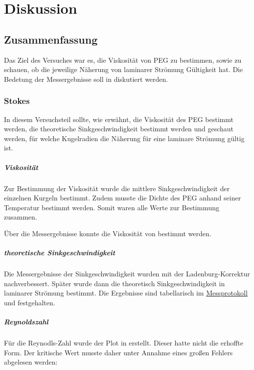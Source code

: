 \chapter{Diskussion}
\label{ch:Diskussion}

\section{Zusammenfassung}
\label{sec:Zusammenfassung}
Das Ziel des Versuches war es, die Viskosität von PEG zu bestimmen, sowie zu schauen, ob die jeweilige Näherung von laminarer Strömung Gültigkeit hat.
Die Bedetung der Messergebnisse soll in  diskutiert werden.

\subsection{Stokes}
In diesem Versuchsteil sollte, wie erwähnt, die Viskosität des PEG bestimmt werden, die theoretische Sinkgeschwindigkeit bestimmt werden und geschaut werden, für welche Kugelradien die Näherung für eine laminare Strömung gültig ist. 

\paragraph{Viskosität}
Zur Bestimmung der Viskosität wurde die mittlere Sinkgeschwindigkeit der einzelnen Kurgeln bestimmt. Zudem musste die Dichte des PEG anhand seiner Temperatur bestimmt werden. Somit waren alle Werte zur Bestimmung zusammen.

Über die Messergebnisse konnte die Viskosität von 
bestimmt werden. 

\paragraph{theoretische Sinkgeschwindigkeit}
Die Messergebnisse der Sinkgeschwindigkeit wurden mit der Ladenburg-Korrektur nachverbessert. Später wurde dann die theoretisch Sinkgeschwindigkeit in laminarer Strömung bestimmt.
Die Ergebnisse sind tabellarisch im \hyperref[ch:Protokoll]{Messprotokoll} und  festgehalten.

\paragraph{Reynoldszahl}
Für die Reynodls-Zahl wurde der Plot in  erstellt. Dieser hatte nicht die erhoffte Form. Der kritische Wert musste daher unter Annahme eines großen Fehlers abgelesen werden:

